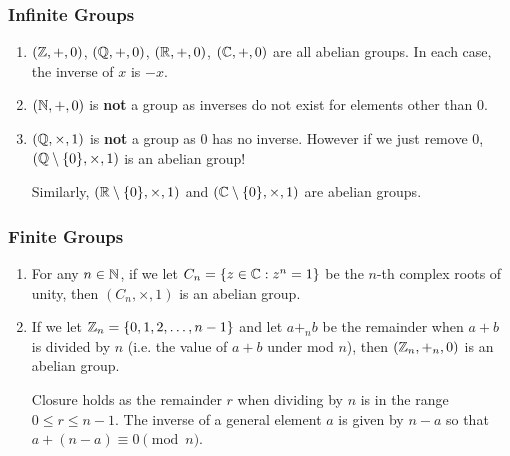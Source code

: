 \documentclass[../main.tex]{subfiles}
\begin{document}
\subsubsection{Infinite Groups}
\begin{enumerate}
  \item $(\mathbb{Z},  +, 0)$, $(\mathbb{Q}, +, 0)$, $(\mathbb{R}, +, 0)$, $(\mathbb{C}, +, 0)$ are all abelian groups.
    In each case, the inverse of $x$ is $-x$.
  \item $(\mathbb{N}, +, 0)$ is \textbf{not} a group as inverses do not exist for elements other than $0$.
  \item $(\mathbb{Q}, \times, 1)$ is \textbf{not} a group as $0$ has no inverse.
    However if we just remove 0, $(\mathbb{Q} \setminus \{0\}, \times, 1)$ is an abelian group!

    Similarly, $(\mathbb{R} \setminus \{0\}, \times, 1)$ and $(\mathbb{C} \setminus \{0\}, \times, 1)$ are abelian groups.
\end{enumerate}
\subsubsection{Finite Groups}
\begin{enumerate} \label{finiteGroupExamples}
  \item For any $n \in \mathbb{N}$, if we let $C_n = \{z \in \mathbb{C} : z^{n} = 1\}$ be the $n$-th complex roots of unity, then $(C_n, \times, 1)$ is an abelian group.
  \item If we let $\mathbb{Z}_n = \{0, 1, 2, \ldots, n - 1\}$ and let $a +_n b$ be the remainder when $a + b$ is divided by $n$ (i.e. the value of $a + b$ under mod $n$), then $(\mathbb{Z}_n, +_n, 0)$ is an abelian group.

    Closure holds as the remainder $r$ when dividing by $n$ is in the range $0 \leq r \leq n - 1$.
    The inverse of a general element $a$ is given by $n - a$ so that $a + (n - a) \equiv 0 \pmod{n}$.
\end{enumerate}
\end{document}
